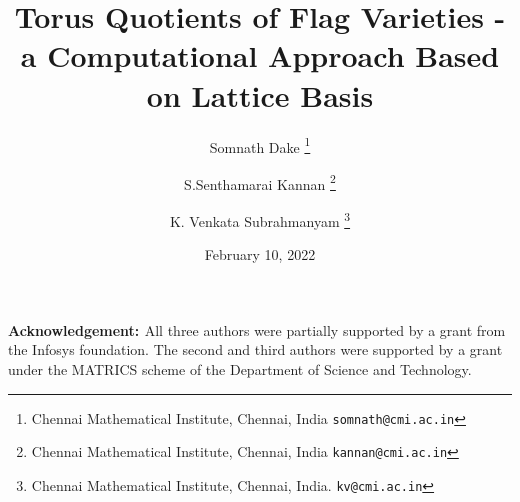 
\usepackage{tikz-cd}

\author{
Somnath Dake \thanks{Chennai Mathematical Institute, Chennai, India \tt{somnath@cmi.ac.in}}
\and
S.Senthamarai Kannan \thanks{Chennai Mathematical Institute, Chennai, India \tt{kannan@cmi.ac.in}}
\and 
K. Venkata Subrahmanyam \thanks {Chennai Mathematical Institute, Chennai, India. \tt{kv@cmi.ac.in}}
}

\title{Torus Quotients of Flag Varieties - a Computational Approach Based on Lattice Basis} 
\date{February 10, 2022} 

\maketitle
%



{\bf{Acknowledgement: }}All three authors were partially supported by a grant from the Infosys foundation. The second and third authors were supported by a grant under the MATRICS scheme of the Department of Science and Technology.



%





\appendix




